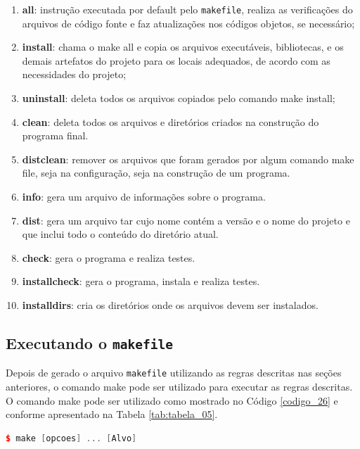 \begin{enumerate}
    \item \textbf{all}: instrução executada por default pelo \texttt{makefile}, 
realiza as verificações do arquivos de código fonte e faz atualizações
 nos códigos objetos, se necessário;
    \item \textbf{install}: chama o make all e copia os arquivos 
executáveis, bibliotecas, e os demais artefatos do projeto para os 
locais adequados, de acordo com as necessidades do projeto;
    \item \textbf{uninstall}: deleta todos os arquivos copiados 
pelo comando make install;
    \item \textbf{clean}: deleta todos os arquivos e diretórios 
criados na construção do programa final.
    \item \textbf{distclean}: remover os arquivos que foram gerados
 por algum comando make file, seja na configuração, seja na
 construção de um programa.
    \item \textbf{info}: gera um arquivo de informações sobre o programa.
    \item \textbf{dist}: gera um arquivo tar cujo nome contém a versão e
o nome do projeto e  que inclui  todo o conteúdo do diretório atual.
    \item \textbf{check}: gera o programa  e realiza testes. 
    \item \textbf{installcheck}: gera o programa, instala e realiza testes.
    \item \textbf{installdirs}: cria  os diretórios onde os arquivos devem ser instalados.
\end{enumerate}


\subsection{Executando o \texttt{makefile}}

Depois de gerado o arquivo \texttt{makefile} utilizando as regras descritas nas seções anteriores,
 o comando make pode ser utilizado para executar as regras descritas.
O comando make pode ser utilizado como mostrado no Código \ref{codigo_26} e conforme apresentado na Tabela \ref{tab:tabela_05}.


    \begin{lstlisting}[language=C++,caption={ 
                                             Utilizando o programa make},
                                                         label=codigo_26]
        $ make [opcoes] ... [Alvo]

    \end{lstlisting}


